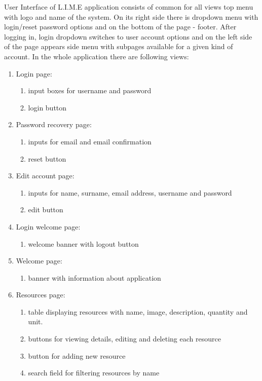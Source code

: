 \documentclass[a4paper,11pt,twoside]{report}
\theoremstyle{definition}
\begin{document}
User Interface of L.I.M.E application consists of common for all views top menu with 
logo and name of the system. On its right side there is dropdown menu with login/reset 
password options and on the bottom of the page - footer. After logging in, login dropdown 
switches  to user account options and on the left side of the page appears side 
menu with subpages available for a given kind of account. In the whole application 
there are following views:
\begin{enumerate}
\item Login page:
\begin{enumerate}
\item input boxes for username and password
\item login button
\end{enumerate}
\item Password recovery page:
\begin{enumerate}
\item inputs for email and email confirmation
\item reset button
\end{enumerate}
\item Edit account page:
\begin{enumerate}
\item inputs for name, surname, email address, username and password
\item edit button
\end{enumerate}
\item Login welcome page:
\begin{enumerate}
\item welcome banner with logout button
\end{enumerate}
\item Welcome page:
\begin{enumerate}
\item banner with information about application
\end{enumerate}
\item Resources page:
\begin{enumerate}
\item table displaying resources with name, image, description, quantity and unit.
\item buttons for viewing details, editing and deleting each resource
\item button for adding new resource
\item search field for filtering resources by name 
\end{enumerate}

\end{enumerate}
\end{document}
